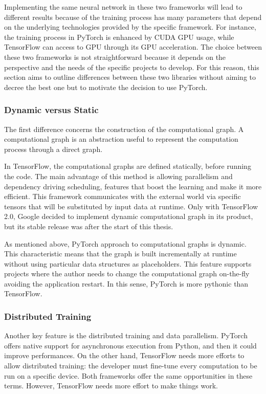 Implementing the same neural network in these two frameworks will lead to different results because of the training process has many parameters that depend on the underlying technologies provided by the specific framework. For instance, the training process in PyTorch is enhanced by CUDA GPU usage, while TensorFlow can access to GPU through its GPU acceleration.
The choice between these two frameworks is not straightforward because it depends on the perspective and the needs of the specific projects to develop.
For this reason, this section aims to outline differences between these two libraries without aiming to decree the best one but to motivate the decision to use PyTorch.

\subsubsection{Dynamic versus Static}

The first difference concerns the construction of the computational graph. A computational graph is an abstraction useful to represent the computation process through a direct graph.

In TensorFlow, the computational graphs are defined statically, before running the code. The main advantage of this method is allowing parallelism and dependency driving scheduling, features that boost the learning and make it more efficient. This framework communicates with the external world via specific tensors that will be substituted by input data at runtime. 
Only with TensorFlow 2.0, Google decided to implement dynamic computational graph in its product, but its stable release was after the start of this thesis.

As mentioned above, PyTorch approach to computational graphs is dynamic. This characteristic means that the graph is built incrementally at runtime without using particular data structures as placeholders. This feature supports projects where the author needs to change the computational graph on-the-fly avoiding the application restart. In this sense, PyTorch is more pythonic than TensorFlow.



\subsubsection{Distributed Training}

Another key feature is the distributed training and data parallelism. PyTorch offers native support for asynchronous execution from Python, and then it could improve performances. On the other hand, TensorFlow needs more efforts to allow distributed training: the developer must fine-tune every computation to be run on a specific device. Both frameworks offer the same opportunities in these terms. However, TensorFlow needs more effort to make things work.

